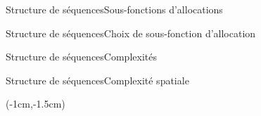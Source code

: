 \begin{frame}{Structure de séquences}{Sous-fonctions d'allocations}
  
  \begin{minipage}{0.45\textwidth}
    \begin{center}
      
    \end{center}
  \end{minipage}
  \hfill
  \begin{minipage}{0.45\textwidth}
    \begin{center}
      
    \end{center}
  \end{minipage}

\end{frame}


\begin{frame}{Structure de séquences}{Choix de sous-fonction d'allocation}

\end{frame}

\begin{frame}{Structure de séquences}{Complexités}

  \begin{minipage}{0.32\textwidth}
    \begin{center}
      
    \end{center}
  \end{minipage}
  \begin{minipage}{0.32\textwidth}
    \begin{center}
      
    \end{center}
  \end{minipage}
  \begin{minipage}{0.32\textwidth}
    \begin{center}
      
    \end{center}
  \end{minipage}

\end{frame}

\begin{frame}{Structure de séquences}{Complexité spatiale}
    \begin{textblock*}{\textwidth}(-1cm,-1.5cm) 
      \begin{table}[H]
        
      \end{table}
    \end{textblock*}
\end{frame}


